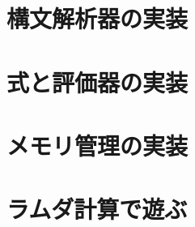 \documentclass[10pt,a4paper]{book}
\begin{document}
\maketitle
\tableofcontents

\chapter{構文解析器の実装}

\chapter{式と評価器の実装}

\chapter{メモリ管理の実装}

\chapter{ラムダ計算で遊ぶ}
\end{document}
